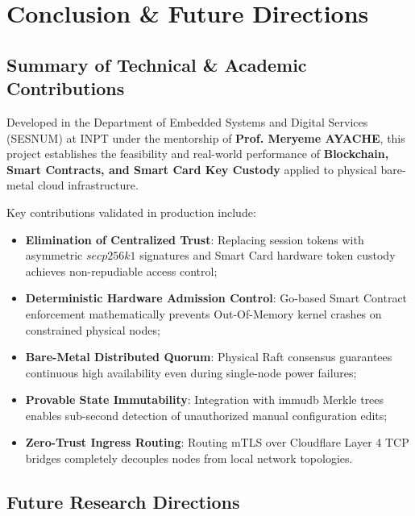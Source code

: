 \documentclass[a4paper,12pt]{article}
\begin{document}
\newpage

\section{Conclusion \& Future Directions}

\subsection{Summary of Technical \& Academic Contributions}

Developed in the Department of Embedded Systems and Digital Services (SESNUM) at INPT under the mentorship of \textbf{Prof. Meryeme AYACHE}, this project establishes the feasibility and real-world performance of \textbf{Blockchain, Smart Contracts, and Smart Card Key Custody} applied to physical bare-metal cloud infrastructure.

Key contributions validated in production include:
\begin{itemize}[leftmargin=1.2cm]
    \item \textbf{Elimination of Centralized Trust}: Replacing session tokens with asymmetric $secp256k1$ signatures and Smart Card hardware token custody achieves non-repudiable access control;
    \item \textbf{Deterministic Hardware Admission Control}: Go-based Smart Contract enforcement mathematically prevents Out-Of-Memory kernel crashes on constrained physical nodes;
    \item \textbf{Bare-Metal Distributed Quorum}: Physical Raft consensus guarantees continuous high availability even during single-node power failures;
    \item \textbf{Provable State Immutability}: Integration with immudb Merkle trees enables sub-second detection of unauthorized manual configuration edits;
    \item \textbf{Zero-Trust Ingress Routing}: Routing mTLS over Cloudflare Layer 4 TCP bridges completely decouples nodes from local network topologies.
\end{itemize}

\subsection{Future Research Directions}
\end{document}
